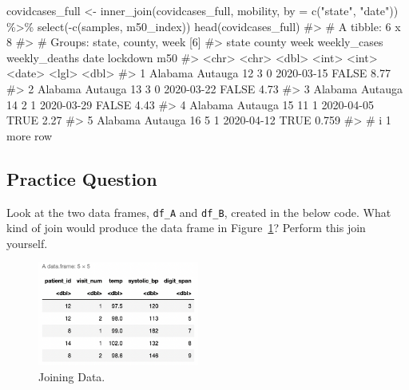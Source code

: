 \documentclass[
  letterpaper,
]{krantz}
\makeatletter
\newenvironment{Shaded}{\begin{snugshade}}{\end{snugshade}}
\newcommand{\AttributeTok}[1]{\textcolor[rgb]{0.40,0.45,0.13}{#1}}
\newcommand{\CommentTok}[1]{\textcolor[rgb]{0.37,0.37,0.37}{#1}}
\newcommand{\FunctionTok}[1]{\textcolor[rgb]{0.28,0.35,0.67}{#1}}
\newcommand{\NormalTok}[1]{\textcolor[rgb]{0.00,0.23,0.31}{#1}}
\newcommand{\OtherTok}[1]{\textcolor[rgb]{0.00,0.23,0.31}{#1}}
\newcommand{\SpecialCharTok}[1]{\textcolor[rgb]{0.37,0.37,0.37}{#1}}
\newcommand{\StringTok}[1]{\textcolor[rgb]{0.13,0.47,0.30}{#1}}
\newenvironment{kframe}{%
\medskip{}
\setlength{\fboxsep}{.8em}
 \def\at@end@of@kframe{}%
 \ifinner\ifhmode%
  \def\at@end@of@kframe{\end{minipage}}%
  \begin{minipage}{\columnwidth}%
 \fi\fi%
 \def\FrameCommand##1{\hskip\@totalleftmargin \hskip-\fboxsep
 \colorbox{shadecolor}{##1}\hskip-\fboxsep
     \hskip-\linewidth \hskip-\@totalleftmargin \hskip\columnwidth}%
 \MakeFramed {\advance\hsize-\width
   \@totalleftmargin\z@ \linewidth\hsize
   \@setminipage}}%
 {\par\unskip\endMakeFramed%
 \at@end@of@kframe}
\renewenvironment{Shaded}{\begin{kframe}}{\end{kframe}}
\makeatother
\begin{document}
\begin{Shaded}
\begin{Highlighting}[]
\NormalTok{covidcases\_full }\OtherTok{\textless{}{-}} \FunctionTok{inner\_join}\NormalTok{(covidcases\_full, mobility, }
                              \AttributeTok{by =} \FunctionTok{c}\NormalTok{(}\StringTok{"state"}\NormalTok{, }\StringTok{"date"}\NormalTok{)) }\SpecialCharTok{\%\textgreater{}\%}
  \FunctionTok{select}\NormalTok{(}\SpecialCharTok{{-}}\FunctionTok{c}\NormalTok{(samples, m50\_index))}
\FunctionTok{head}\NormalTok{(covidcases\_full)}
\CommentTok{\#\textgreater{} \# A tibble: 6 x 8}
\CommentTok{\#\textgreater{} \# Groups:   state, county, week [6]}
\CommentTok{\#\textgreater{}   state   county   week weekly\_cases weekly\_deaths date       lockdown   m50}
\CommentTok{\#\textgreater{}   \textless{}chr\textgreater{}   \textless{}chr\textgreater{}   \textless{}dbl\textgreater{}        \textless{}int\textgreater{}         \textless{}int\textgreater{} \textless{}date\textgreater{}     \textless{}lgl\textgreater{}    \textless{}dbl\textgreater{}}
\CommentTok{\#\textgreater{} 1 Alabama Autauga    12            3             0 2020{-}03{-}15 FALSE    8.77 }
\CommentTok{\#\textgreater{} 2 Alabama Autauga    13            3             0 2020{-}03{-}22 FALSE    4.73 }
\CommentTok{\#\textgreater{} 3 Alabama Autauga    14            2             1 2020{-}03{-}29 FALSE    4.43 }
\CommentTok{\#\textgreater{} 4 Alabama Autauga    15           11             1 2020{-}04{-}05 TRUE     2.27 }
\CommentTok{\#\textgreater{} 5 Alabama Autauga    16            5             1 2020{-}04{-}12 TRUE     0.759}
\CommentTok{\#\textgreater{} \# i 1 more row}
\end{Highlighting}
\end{Shaded}

\hypertarget{practice-question-12}{%
\subsection{Practice Question}\label{practice-question-12}}

Look at the two data frames, \texttt{df\_A} and \texttt{df\_B}, created
in the below code. What kind of join would produce the data frame in
Figure~\ref{fig-pq2}? Perform this join yourself.

\begin{figure}

{\centering \includegraphics[width=2.08333in,height=\textheight]{book/images/6-practicequestion2answer.png}

}

\caption{\label{fig-pq2}Joining Data.}

\end{figure}
\end{document}
